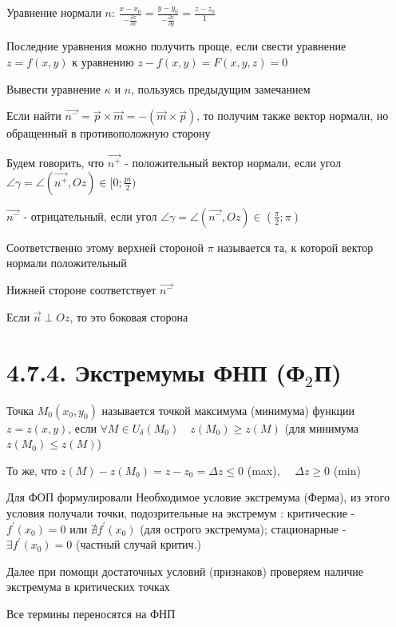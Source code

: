 \documentclass[12pt]{article}
\begin{document}
    Уравнение нормали $n$: $\frac{x - x_0}{-\frac{\partial z}{\partial x}} = \frac{y - y_0}{-\frac{\partial z}{\partial y}} = \frac{z - z_0}{1}$

    \Nota Последние уравнения можно получить проще, если свести уравнение $z = f(x, y)$ к уравнению $z - f(x, y) = F(x, y, z) = 0$

    \Lab Вывести уравнение $\kappa$ и $n$, пользуясь предыдущим замечанием

    \Nota Если найти $\overrightarrow{n^-} = \overrightarrow{p} \times \overrightarrow{m} = - (\overrightarrow{m} \times \overrightarrow{p})$, то получим также вектор нормали, но обращенный в противоположную сторону

    Будем говорить, что $\overrightarrow{n^+}$ - положительный вектор нормали, если угол $\angle\gamma = \angle (\overrightarrow{n^+}, Oz) \in [0; \frac{pi}{2})$

    $\overrightarrow{n^-}$ - отрицательный, если угол $\angle\gamma = \angle (\overrightarrow{n^-}, Oz) \in \left(\frac{\pi}{2}; \pi\right)$

    Соответственно этому верхней стороной $\pi$ называется та, к которой вектор нормали положительный

    Нижней стороне соответствует $\overrightarrow{n^-}$

    Если $\overrightarrow{n} \perp Oz$, то это боковая сторона

    \section{4.7.4. Экстремумы ФНП (Ф$_2$П)}

    \Def Точка $M_0(x_0, y_0)$ называется точкой максимума (минимума) функции $z = z(x, y)$, если $\forall M \in U_\delta (M_0) \quad z(M_0) \geq z(M)$ (для минимума $z(M_0) \leq z(M)$)

    \Nota То же, что $z(M) - z(M_0) = z - z_0 = \Delta z \leq 0$ (max), $\quad \Delta z \geq 0$ (min)

    \Mem Для ФОП формулировали Необходимое условие экстремума (Ферма), из этого условия получали точки, подозрительные на экстремум : критические - $f^\prime(x_0) = 0$ или $\nexists f^\prime(x_0)$ (для острого экстремума); стационарные - $\exists f^\prime(x_0) = 0$ (частный случай критич.)

    Далее при помощи достаточных условий (признаков) проверяем наличие экстремума в критических точках

    \Nota Все термины переносятся на ФНП
\end{document}
